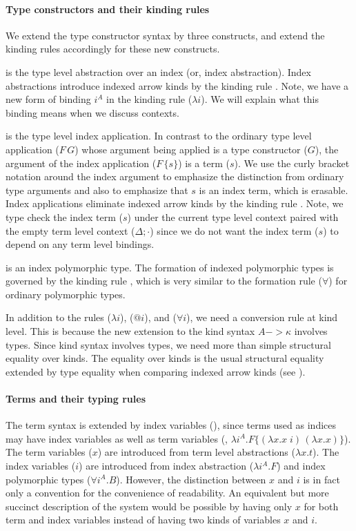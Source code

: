 \paragraph{Type constructors and their kinding rules}
We extend the type constructor syntax by three constructs,
and extend the kinding rules accordingly for these new constructs.

 is the type level abstraction over an index
(or, index abstraction). Index abstractions introduce indexed arrow kinds
by the kinding rule . Note, we have a new form of binding
$i^A$ in the kinding rule ($\lambda i$).
We will explain what this binding means when we discuss contexts.

 is the type level index application. In contrast to
the ordinary type level application ($F\,G$) whose argument being applied is
a type constructor ($G$), the argument of the index application ($F\,\{s\}$) is
a term ($s$). We use the curly bracket notation around the index argument to
emphasize the distinction from ordinary type arguments and also to emphasize
that $s$ is an index term, which is erasable. Index applications eliminate
indexed arrow kinds by the kinding rule . Note, we type check
the index term ($s$) under the current type level context paired with
the empty term level context ($\Delta;\cdot$) since we do not want
the index term ($s$) to depend on any term level bindings.

 is an index polymorphic type.
The formation of indexed polymorphic types is governed by
the kinding rule , which is very similar to
the formation rule ($\forall$) for ordinary polymorphic types.

In addition to the rules ($\lambda i$), ($@ i$), and ($\forall i$),
we need a conversion rule  at kind level. This is because
the new extension to the kind syntax $A -> \kappa$ involves types.
Since kind syntax involves types, we need more than simple structural
equality over kinds. The equality over kinds is the usual structural
equality extended by type equality when comparing indexed arrow kinds
(see ).

\paragraph{Terms and their typing rules}
The term syntax is extended by index variables (), since terms used
as indices may have index variables as well as term variables
(\eg, $\lambda i^A.F\{(\lambda x.x\;i)\,(\lambda x.x)\}$).
The term variables ($x$) are introduced from
term level abstractions ($\lambda x.t$).
The index variables ($i$) are introduced from
index abstraction ($\lambda i^A.F$) and
index polymorphic types ($\forall i^A.B$). However, the distinction between
$x$ and $i$ is in fact only a convention for the convenience of readability.
An equivalent but more succinct description of the system would be possible
by having only $x$ for both term and index variables instead of having two
kinds of variables $x$ and $i$.

